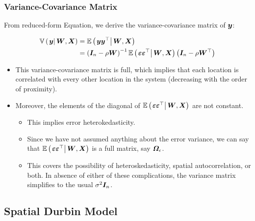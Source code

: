 \documentclass[english,10pt]{beamer}\usepackage[]{graphicx}\usepackage[]{xcolor}
\begin{document}
\begin{frame}
  \frametitle{Variance-Covariance Matrix}
  From reduced-form Equation, we derive the variance-covariance matrix of $\bm y$:

\begin{equation}
  \begin{aligned}
    \mathbb{V}\left(\left.\bm y\right|\bm W, \bm X\right) & = \mathbb{E}\left(\left.\bm y\bm y^\top\right|\bm W,\bm X\right) \\ 
                               & = \left(\bm I_n - \rho\bm W\right)^{-1}\mathbb{E}\left(\left.\bm {\varepsilon}\bm {\varepsilon}^\top\right|\bm W, \bm X\right)\left(\bm I_n- \rho\bm W^\top\right)
  \end{aligned}
\end{equation}

\begin{itemize}
  \item This variance-covariance matrix is full, which implies that each location is correlated with every other location in the system (decreasing with the order of proximity).
  \item Moreover, the elements of the diagonal of $\mathbb{E}\left(\left.\bm {\varepsilon}\bm {\varepsilon}^\top\right|\bm W, \bm X\right)$ are not constant.
    \begin{itemize}
      \item This implies error heterokedasticity.
      \item Since we have not assumed anything about the error variance, we can say that $\mathbb{E}\left(\left.\bm {\varepsilon}\bm {\varepsilon}^\top\right|\bm W, \bm X\right)$ is a full matrix, say $\bm \varOmega_{\epsilon}$.
      \item  This covers the possibility of heteroskedasticity, spatial autocorrelation, or both. In absence of either of these complications, the variance matrix simplifies to the usual $\sigma^2\bm I_n$.
    \end{itemize}
\end{itemize}
\end{frame}

\subsection{Spatial Durbin Model}
\end{document}
